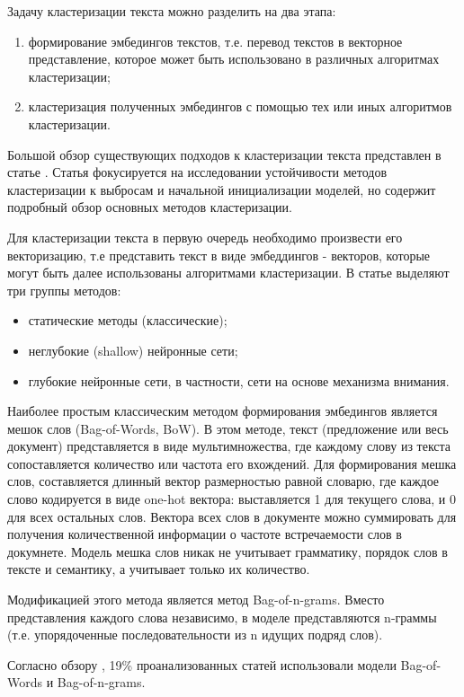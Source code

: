 Задачу кластеризации текста можно разделить на два этапа:
\begin{enumerate}
    \item формирование эмбедингов текстов, т.е. перевод текстов в векторное представление, которое может быть использовано в различных алгоритмах кластеризации;
    \item кластеризация полученных эмбедингов с помощью тех или иных алгоритмов кластеризации.
\end{enumerate}

Большой обзор существующих подходов к кластеризации текста представлен в статье \cite{no-patterns}. Статья фокусируется на исследовании устойчивости методов кластеризации к выбросам и начальной инициализации моделей, но содержит подробный обзор основных методов кластеризации.

Для кластеризации текста в первую очередь необходимо произвести его векторизацию, т.е представить текст в виде эмбеддингов - векторов, которые могут быть далее использованы алгоритмами кластеризации. В статье выделяют три группы методов:
\begin{itemize}
    \item статические методы (классические);
    \item неглубокие (shallow) нейронные сети;
    \item глубокие нейронные сети, в частности, сети на основе механизма внимания.
\end{itemize}

Наиболее простым классическим методом формирования эмбедингов является мешок слов (Bag-of-Words, BoW). В этом методе, текст (предложение или весь документ) представляется в виде мультимножества, где каждому слову из текста сопоставляется количество или частота его вхождений. Для формирования мешка слов, составляется длинный вектор размерностью равной словарю, где каждое слово кодируется в виде one-hot вектора: выставляется 1 для текущего слова, и 0 для всех остальных слов. Вектора всех слов в документе можно суммировать для получения количественной информации о частоте встречаемости слов в докумнете. Модель мешка слов никак не учитывает грамматику, порядок слов в тексте и семантику, а учитывает только их количество.

Модификацией этого метода является метод Bag-of-n-grams. Вместо представления каждого слова независимо, в моделе представляются n-граммы (т.е. упорядоченные последовательности из n идущих подряд слов).

Согласно обзору \cite{no-patterns}, 19\% проанализованных статей использовали модели Bag-of-Words и Bag-of-n-grams.

